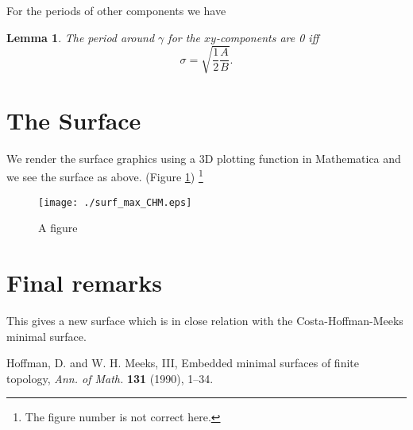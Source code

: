 \documentclass[11pt]{article}
\newtheorem{lemma}[theorem]{Lemma}
\begin{document}
For the periods of other components we have

\begin{lemma}\label{Lem:space-period}
    The period around $\gamma$ for the
    $xy$-components are 0 iff
    \begin{equation*}
        \sigma = \sqrt{\frac{1}{2} \frac{A}{B}}.
    \end{equation*}
\end{lemma}


\section{The Surface}
We render the surface graphics
using a 3D plotting function in Mathematica and we see the surface as above.
(Figure \ref{Afigure})%
\footnote{The figure number is not correct here.}

\begin{figure}
\begin{center}\label{Afigure}
{\texttt{[image: ./surf\_max\_CHM.eps]}}
\end{center}
\caption{A figure}
\end{figure}



\section{Final remarks}
This gives a new surface which is in close relation with the
Costa-Hoffman-Meeks minimal surface\cite{hoffman_meeks}.



\begin{thebibliography}{9}

Hoffman, D.{} and W.{} H.{} Meeks, III, 
Embedded minimal surfaces of finite topology, \textsl{Ann.{} of Math.} 
\textbf{131} (1990), 1--34.


\end{thebibliography}
\end{document}
